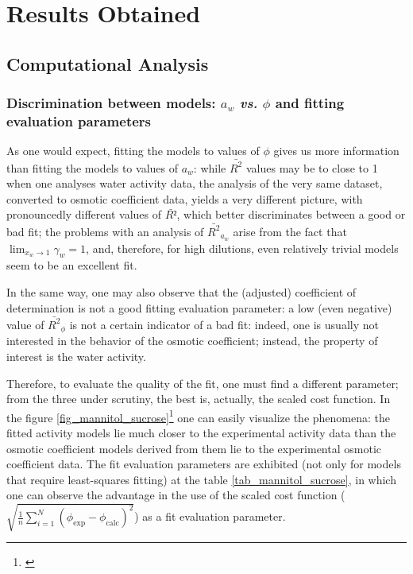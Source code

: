 \documentclass[
	12pt,				%
	openright,
	twoside,
	a4paper,			%
	brazil,			%
	french,				%
	english				%
	]{abntex2}
\begin{document}
\part{Results Obtained}

\chapter{Computational Analysis}

\section{Discrimination between models: $a_w$ \textit{vs.} $\phi$ and %
fitting evaluation parameters}

As one would expect, fitting the models to values of $\phi$ gives us more
information than fitting the models to values of $a_w$: while $\bar{R^2}$ values
may be to close to 1 when one analyses water activity data, the analysis of
the very same dataset, converted to osmotic coefficient data, yields a very
different picture, with pronouncedly different values of $\bar{R²}$, which
better discriminates between a good or bad fit; the problems with an analysis
of $\bar{R^2}_{a_w}$ arise from the fact that $\lim_{x_w \to 1}\gamma_w = 1$,
and, therefore, for high dilutions, even relatively trivial models seem to be
an excellent fit.

In the same way, one may also observe that the (adjusted) coefficient of
determination is not a good fitting evaluation parameter: a low (even negative)
value of $\bar{R^2}_\phi$ is not a certain indicator of a bad fit: indeed, one
is usually not interested in the behavior of the osmotic coefficient; instead, the
property of interest is the water activity.

Therefore, to evaluate the quality of the fit, one must find a different parameter;
from the three under scrutiny, the best is, actually, the scaled cost function.
In the figure \ref{fig_mannitol_sucrose}\footnote{\cite{stokes1961}} one can easily
visualize the phenomena: the fitted activity models lie much closer to the
experimental activity data than the osmotic coefficient models derived from them
lie to the experimental osmotic coefficient data. The fit evaluation parameters are
exhibited (not only for models that require least-squares fitting) at the table
\ref{tab_mannitol_sucrose}, in which one can observe the advantage in the use of
the scaled cost function ($\sqrt{\frac{1}{n}\sum_{i=1}^N(\phi_{\text{exp}}-%
\phi_{\text{calc}})^2}$) as a fit evaluation parameter.
\end{document}
